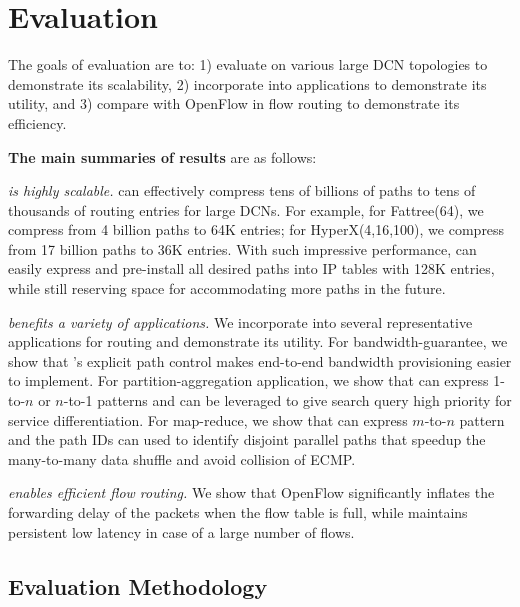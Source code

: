 \section{Evaluation}\label{sec:evaluation}

The goals of evaluation are to: 1) evaluate \sys on various large DCN topologies to demonstrate its scalability, 2) incorporate \sys into applications to demonstrate its utility, and 3) compare \sys with OpenFlow in flow routing to demonstrate its efficiency.

\textbf{The main summaries of results} are as follows:

\begin{icompact}

\item \emph{\sys is highly scalable.} \sys can effectively compress tens of billions of paths to tens of thousands of routing entries for large DCNs. For example, for Fattree(64), we compress from 4 billion paths to 64K entries; for HyperX(4,16,100), we compress from 17 billion paths to 36K entries. With such impressive performance, \sys can easily express and pre-install all desired paths into IP tables with 128K entries, while still reserving space for accommodating more paths in the future.

\item \emph{\sys benefits a variety of applications.}  We incorporate \sys into several representative applications for routing and demonstrate its utility. For bandwidth-guarantee, we show that \sys's explicit path control makes end-to-end bandwidth provisioning easier to implement. For partition-aggregation application, we show that \sys can express 1-to-$n$ or $n$-to-1 patterns and can be leveraged to give search query high priority for service differentiation. For map-reduce, we show that \sys can express $m$-to-$n$ pattern and the path IDs can used to identify disjoint parallel paths that speedup the many-to-many data shuffle and avoid collision of ECMP.

\item \emph{\sys enables efficient flow routing.} We show that OpenFlow significantly inflates the forwarding delay of the packets when the flow table is full, while \sys maintains persistent low latency in case of a large number of flows.


\end{icompact}


\subsection{Evaluation Methodology}

